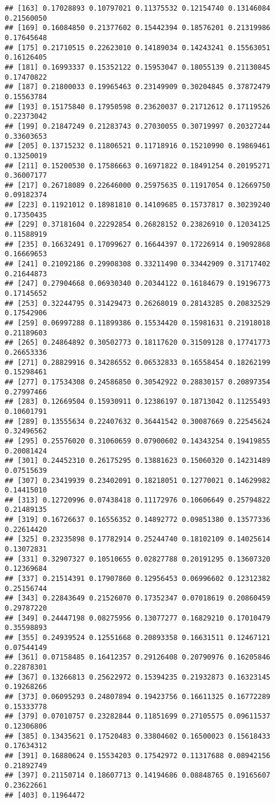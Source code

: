 \documentclass[
]{article}
\begin{document}
\begin{verbatim}
## [163] 0.17028893 0.10797021 0.11375532 0.12154740 0.13146084 0.21560050
## [169] 0.16084850 0.21377602 0.15442394 0.18576201 0.21319986 0.17645648
## [175] 0.21710515 0.22623010 0.14189034 0.14243241 0.15563051 0.16126405
## [181] 0.16993337 0.15352122 0.15953047 0.18055139 0.21130845 0.17470822
## [187] 0.21800033 0.19965463 0.23149909 0.30204845 0.37872479 0.15563784
## [193] 0.15175840 0.17950598 0.23620037 0.21712612 0.17119526 0.22373042
## [199] 0.21847249 0.21283743 0.27030055 0.30719997 0.20327244 0.33603653
## [205] 0.13715232 0.11806521 0.11718916 0.15210990 0.19869461 0.13250019
## [211] 0.15200530 0.17586663 0.16971822 0.18491254 0.20195271 0.36007177
## [217] 0.26718089 0.22646000 0.25975635 0.11917054 0.12669750 0.09182374
## [223] 0.11921012 0.18981810 0.14109685 0.15737817 0.30239240 0.17350435
## [229] 0.37181604 0.22292854 0.26828152 0.23826910 0.12034125 0.11588919
## [235] 0.16632491 0.17099627 0.16644397 0.17226914 0.19092868 0.16669653
## [241] 0.21092186 0.29908308 0.33211490 0.33442909 0.31717402 0.21644873
## [247] 0.27904668 0.06930340 0.20344122 0.16184679 0.19196773 0.17145652
## [253] 0.32244795 0.31429473 0.26268019 0.28143285 0.20832529 0.17542906
## [259] 0.06997288 0.11899386 0.15534420 0.15981631 0.21918018 0.21189603
## [265] 0.24864892 0.30502773 0.18117620 0.31509128 0.17741773 0.26653336
## [271] 0.28829916 0.34286552 0.06532833 0.16558454 0.18262199 0.15298461
## [277] 0.17534308 0.24586850 0.30542922 0.28830157 0.20897354 0.27997466
## [283] 0.12669504 0.15930911 0.12386197 0.18713042 0.11255493 0.10601791
## [289] 0.13555634 0.22407632 0.36441542 0.30087669 0.22545624 0.32496562
## [295] 0.25576020 0.31060659 0.07900602 0.14343254 0.19419855 0.20081424
## [301] 0.24452310 0.26175295 0.13881623 0.15060320 0.14231489 0.07515639
## [307] 0.23419939 0.23402091 0.18218051 0.12770021 0.14629982 0.14415010
## [313] 0.12720996 0.07438418 0.11172976 0.10606649 0.25794822 0.21489135
## [319] 0.16726637 0.16556352 0.14892772 0.09851380 0.13577336 0.22614420
## [325] 0.23235898 0.17782914 0.25244740 0.18102109 0.14025614 0.13072831
## [331] 0.32907327 0.10510655 0.02827788 0.20191295 0.13607320 0.12369684
## [337] 0.21514391 0.17907860 0.12956453 0.06996602 0.12312382 0.25156744
## [343] 0.22843649 0.21526070 0.17352347 0.07018619 0.20860459 0.29787220
## [349] 0.24447198 0.08275956 0.13077277 0.16829210 0.17010479 0.35598893
## [355] 0.24939524 0.12551668 0.20893358 0.16631511 0.12467121 0.07544149
## [361] 0.07158485 0.16412357 0.29126408 0.20790976 0.16205846 0.22878301
## [367] 0.13266813 0.25622972 0.15394235 0.21932873 0.16323145 0.19268266
## [373] 0.06095293 0.24807894 0.19423756 0.16611325 0.16772289 0.15333778
## [379] 0.07010757 0.23282844 0.11851699 0.27105575 0.09611537 0.12306806
## [385] 0.13435621 0.17520483 0.33804602 0.16500023 0.15618433 0.17634312
## [391] 0.16880624 0.15534203 0.17542972 0.11317688 0.08942156 0.21892749
## [397] 0.21150714 0.18607713 0.14194686 0.08848765 0.19165607 0.23622661
## [403] 0.11964472
\end{verbatim}
\end{document}
